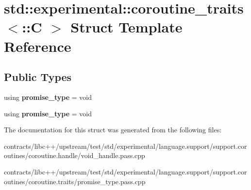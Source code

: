 \hypertarget{structstd_1_1experimental_1_1coroutine__traits_3_1_1_c_01_4}{}\section{std\+:\+:experimental\+:\+:coroutine\+\_\+traits$<$\+:\+:C $>$ Struct Template Reference}
\label{structstd_1_1experimental_1_1coroutine__traits_3_1_1_c_01_4}
\subsection*{Public Types}
\begin{DoxyCompactItemize}
\item 
\mbox{\label{structstd_1_1experimental_1_1coroutine__traits_3_1_1_c_01_4_a967a8f02d2b9860dc31f7728c4a7d792}} 
using {\bfseries promise\+\_\+type} = void
\item 
\mbox{\label{structstd_1_1experimental_1_1coroutine__traits_3_1_1_c_01_4_a967a8f02d2b9860dc31f7728c4a7d792}} 
using {\bfseries promise\+\_\+type} = void
\end{DoxyCompactItemize}


The documentation for this struct was generated from the following files\+:\begin{DoxyCompactItemize}
\item 
contracts/libc++/upstream/test/std/experimental/language.\+support/support.\+coroutines/coroutine.\+handle/void\+\_\+handle.\+pass.\+cpp\item 
contracts/libc++/upstream/test/std/experimental/language.\+support/support.\+coroutines/coroutine.\+traits/promise\+\_\+type.\+pass.\+cpp\end{DoxyCompactItemize}
